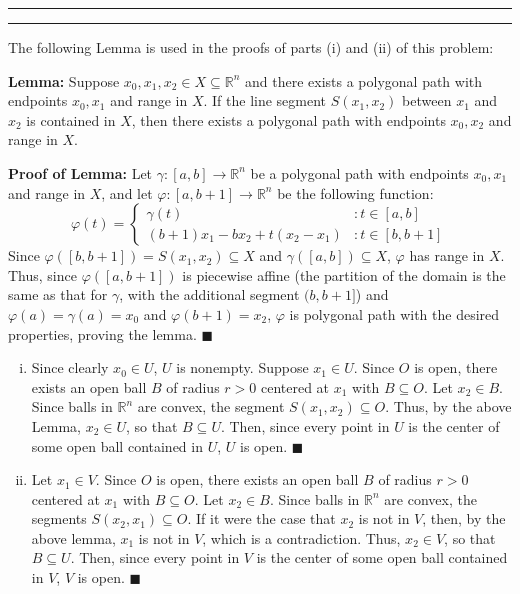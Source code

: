 \documentclass[11pt]{article}
\newcounter{questionCounter}
\newcounter{partCounter}[questionCounter]
\newenvironment{question}[2][\arabic{questionCounter}]{%
    \setcounter{partCounter}{0}%
    \vspace{.25in} \hrule \vspace{0.5em}%
        \noindent{\bf #2}%
    \vspace{0.8em} \hrule \vspace{.10in}%
    \addtocounter{questionCounter}{1}%
}{}
\renewcommand{\qed}{\quad $\blacksquare$}
\newcommand{\R}{\mathbb{R}} %
\begin{document}
\begin{question}{Problem 5}
The following Lemma is used in the proofs of parts (i) and (ii) of this
problem:

{\bf Lemma:} Suppose $x_0,x_1,x_2 \in X \subseteq \R^n$ and there exists a
polygonal path with endpoints $x_0,x_1$ and range in $X$. If the line segment
$S(x_1,x_2)$ between $x_1$ and $x_2$ is contained in $X$, then there exists a
polygonal path with endpoints $x_0,x_2$ and range in $X$.

{\bf Proof of Lemma:} Let $\gamma: [a,b] \rightarrow \R^n$ be a polygonal path
with endpoints $x_0,x_1$ and range in $X$, and let
$\varphi: [a,b + 1] \rightarrow \R^n$ be the following function:
\[
   \varphi(t) = \left\{
     \begin{array}{lr}
       \gamma(t)                       & : t \in [a,b]      \\
       (b + 1)x_1 - bx_2 + t(x_2 - x_1)& : t \in [b,b + 1]
     \end{array}
   \right.
\]
Since $\varphi([b,b + 1]) = S(x_1,x_2) \subseteq X$ and
$\gamma([a,b]) \subseteq X$, $\varphi$ has range in $X$. Thus, since
$\varphi([a,b + 1])$ is piecewise affine (the partition of the domain is the
same as that for $\gamma$, with the additional segment $(b,b + 1]$) and
$\varphi(a) = \gamma(a) = x_0$ and $\varphi(b + 1) = x_2$, $\varphi$ is
polygonal path with the desired properties, proving the lemma. \qed

\begin{enumerate}[(i)]
\item Since clearly $x_0 \in U$, $U$ is nonempty.
Suppose $x_1 \in U$. Since $O$ is open, there exists an open ball $B$ of
radius $r > 0$ centered at $x_1$ with $B \subseteq O$. Let $x_2 \in B$. Since
balls in $\R^n$ are convex, the segment $S(x_1,x_2) \subseteq O$. Thus, by
the above Lemma, $x_2 \in U$, so that $B \subseteq U$. Then, since every point
in $U$ is the center of some open ball contained in $U$, $U$ is open. \qed

\item Let $x_1 \in V$. Since $O$ is open, there exists an open ball $B$ of
radius $r > 0$ centered at $x_1$ with $B \subseteq O$. Let $x_2 \in B$. Since
balls in $\R^n$ are convex, the segments $S(x_2,x_1) \subseteq O$. If it were
the case that $x_2$ is not in $V$, then, by the above lemma, $x_1$ is not in
$V$, which is a contradiction. Thus, $x_2 \in V$, so that $B \subseteq U$.
Then, since every point in $V$ is the center of some open ball contained in
$V$, $V$ is open. \qed

\end{enumerate}
\end{question}
\end{document}
